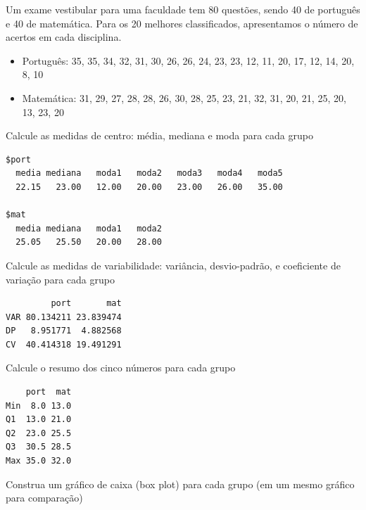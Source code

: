 \documentclass[a4paper,11pt,fleqn]{article}\usepackage[]{graphicx}\usepackage[]{color}
\makeatletter
\newenvironment{kframe}{%
 \def\at@end@of@kframe{}%
 \ifinner\ifhmode%
  \def\at@end@of@kframe{\end{minipage}}%
  \begin{minipage}{\columnwidth}%
 \fi\fi%
 \def\FrameCommand##1{\hskip\@totalleftmargin \hskip-\fboxsep
 \colorbox{shadecolor}{##1}\hskip-\fboxsep
     \hskip-\linewidth \hskip-\@totalleftmargin \hskip\columnwidth}%
 \MakeFramed {\advance\hsize-\width
   \@totalleftmargin\z@ \linewidth\hsize
   \@setminipage}}%
 {\par\unskip\endMakeFramed%
 \at@end@of@kframe}
\newenvironment{knitrout}{}{} %
\theoremstyle{definition}
\makeatother
\begin{document}
\begin{compactenum}[4.] %
\item Um exame vestibular para uma faculdade tem 80 questões, sendo 40
  de português e 40 de matemática. Para os 20 melhores classificados,
  apresentamos o número de acertos em cada disciplina.
  \begin{itemize}
  \item Português: 35, 35, 34, 32, 31, 30, 26, 26, 24, 23, 23, 12, 11,
    20, 17, 12, 14, 20, 8, 10
  \item Matemática: 31, 29, 27, 28, 28, 26, 30, 28, 25, 23, 21, 32, 31,
    20, 21, 25, 20, 13, 23, 20
  \end{itemize}

\begin{compactenum}
\item Calcule as medidas de centro: média, mediana e moda para cada grupo
\begin{knitrout}\small
{}\color{fgcolor}\begin{kframe}
\begin{verbatim}
$port
  media mediana   moda1   moda2   moda3   moda4   moda5 
  22.15   23.00   12.00   20.00   23.00   26.00   35.00 

$mat
  media mediana   moda1   moda2 
  25.05   25.50   20.00   28.00 
\end{verbatim}
\end{kframe}
\end{knitrout}
  \item Calcule as medidas de variabilidade: variância, desvio-padrão, e
    coeficiente de variação para cada grupo
\begin{knitrout}\small
{}\color{fgcolor}\begin{kframe}
\begin{verbatim}
         port       mat
VAR 80.134211 23.839474
DP   8.951771  4.882568
CV  40.414318 19.491291
\end{verbatim}
\end{kframe}
\end{knitrout}
  \item Calcule o resumo dos cinco números para cada grupo
\begin{knitrout}\small
{}\color{fgcolor}\begin{kframe}
\begin{verbatim}
    port  mat
Min  8.0 13.0
Q1  13.0 21.0
Q2  23.0 25.5
Q3  30.5 28.5
Max 35.0 32.0
\end{verbatim}
\end{kframe}
\end{knitrout}
  \item Construa um gráfico de caixa (box plot) para cada grupo (em um mesmo
    gráfico para comparação)
\begin{knitrout}\small
{}\color{fgcolor}


\end{knitrout}
\end{compactenum}
\end{compactenum}
\end{document}
